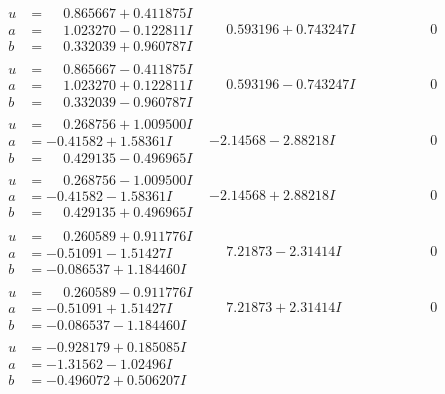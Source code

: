\documentclass[1p]{elsarticle_modified}
\theoremstyle{definition}
\begin{document}
$$\begin{array}{c|c|c}
\begin{aligned}
u &= \phantom{-}0.865667 + 0.411875 I \\
a &= \phantom{-}1.023270 - 0.122811 I \\
b &= \phantom{-}0.332039 + 0.960787 I\end{aligned}
 & \phantom{-}0.593196 + 0.743247 I & \phantom{-0.000000 } 0 \\ \hline\begin{aligned}
u &= \phantom{-}0.865667 - 0.411875 I \\
a &= \phantom{-}1.023270 + 0.122811 I \\
b &= \phantom{-}0.332039 - 0.960787 I\end{aligned}
 & \phantom{-}0.593196 - 0.743247 I & \phantom{-0.000000 } 0 \\ \hline\begin{aligned}
u &= \phantom{-}0.268756 + 1.009500 I \\
a &= -0.41582 + 1.58361 I \\
b &= \phantom{-}0.429135 - 0.496965 I\end{aligned}
 & -2.14568 - 2.88218 I & \phantom{-0.000000 } 0 \\ \hline\begin{aligned}
u &= \phantom{-}0.268756 - 1.009500 I \\
a &= -0.41582 - 1.58361 I \\
b &= \phantom{-}0.429135 + 0.496965 I\end{aligned}
 & -2.14568 + 2.88218 I & \phantom{-0.000000 } 0 \\ \hline\begin{aligned}
u &= \phantom{-}0.260589 + 0.911776 I \\
a &= -0.51091 - 1.51427 I \\
b &= -0.086537 + 1.184460 I\end{aligned}
 & \phantom{-}7.21873 - 2.31414 I & \phantom{-0.000000 } 0 \\ \hline\begin{aligned}
u &= \phantom{-}0.260589 - 0.911776 I \\
a &= -0.51091 + 1.51427 I \\
b &= -0.086537 - 1.184460 I\end{aligned}
 & \phantom{-}7.21873 + 2.31414 I & \phantom{-0.000000 } 0 \\ \hline\begin{aligned}
u &= -0.928179 + 0.185085 I \\
a &= -1.31562 - 1.02496 I \\
b &= -0.496072 + 0.506207 I\end{aligned}

\end{array}$$
\end{document}
